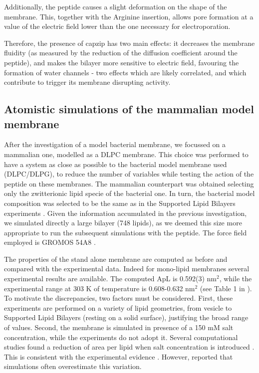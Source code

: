 Additionally, the peptide causes a slight deformation on the shape of the membrane. This, together with the Arginine insertion, allows pore formation at a value of the electric field lower than the one necessary for electroporation.

Therefore, the presence of capzip has two main effects: it decreases the membrane fluidity (as measured by the reduction of the diffusion coefficient around the peptide), and makes the bilayer more sensitive to electric field, favouring the formation of water channels - two effects which are likely correlated, and which contribute to trigger its membrane disrupting activity.


\subsection{Atomistic simulations of the mammalian model membrane} \label{sec:lip_atom_mamm}

After the investigation of a model bacterial membrane, we focussed on a mammalian one, modelled as a DLPC membrane. This choice was performed to have a system as close as possible to the bacterial model membrane used (DLPC/DLPG), to reduce the number of variables while testing the action of the peptide on these membranes. The mammalian counterpart was obtained selecting only the zwitterionic lipid specie of the bacterial one. In turn, the bacterial model composition was selected to be the same as in the Supported Lipid Bilayers experiments \citep{Castelletto2016}.
%
Given the information accumulated in the previous investigation, we simulated directly a large bilayer (748 lipids), as we deemed this size more appropriate to run the subsequent simulations with the peptide. The force field employed is GROMOS 54A8 \citep{Reif2012}.

The properties of the stand alone membrane are computed as before and compared with the experimental data. Indeed for mono-lipid membranes several experimental results are available. The computed ApL is 0.592(3) nm$^2$, while the experimental range at 303 K of temperature is 0.608-0.632 nm$^2$ (see Table 1 in \citet{Poger2016}). To motivate the discrepancies, two factors must be considered. First, these experiments are performed on a variety of lipid geometries, from vesicle to Supported Lipid Bilayers (resting on a solid surface), justifying the broad range of values. Second, the membrane is simulated in presence of a 150 mM salt concentration, while the experiments do not adopt it. Several computational studies found a reduction of area per lipid when salt concentration is introduced \citep{Bockmann2003,Jarerattanachat2013,Reif2017}. This is consistent with the experimental evidence \citep{Pabst2007}. However, \citet{Reif2017} reported that simulations often overestimate this variation.

